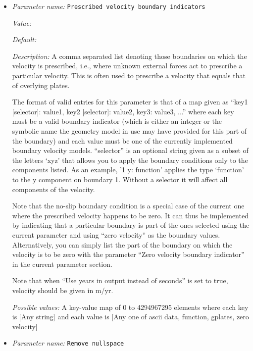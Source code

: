 \begin{itemize}
{\it Possible values:} A key-value map of 0 to 4294967295 elements  where each key is [Any string] and each value is [Any one of ascii data, function, initial lithostatic pressure, zero traction]
\item {\it Parameter name:} {\tt Prescribed velocity boundary indicators}
\label{parameters:Model settings/Prescribed velocity boundary indicators}


{\it Value:} 


{\it Default:} 


{\it Description:} A comma separated list denoting those boundaries on which the velocity is prescribed, i.e., where unknown external forces act to prescribe a particular velocity. This is often used to prescribe a velocity that equals that of overlying plates.

The format of valid entries for this parameter is that of a map given as ``key1 [selector]: value1, key2 [selector]: value2, key3: value3, ...'' where each key must be a valid boundary indicator (which is either an integer or the symbolic name the geometry model in use may have provided for this part of the boundary) and each value must be one of the currently implemented boundary velocity models. ``selector'' is an optional string given as a subset of the letters `xyz' that allows you to apply the boundary conditions only to the components listed. As an example, '1 y: function' applies the type `function' to the y component on boundary 1. Without a selector it will affect all components of the velocity.

Note that the no-slip boundary condition is a special case of the current one where the prescribed velocity happens to be zero. It can thus be implemented by indicating that a particular boundary is part of the ones selected using the current parameter and using ``zero velocity'' as the boundary values. Alternatively, you can simply list the part of the boundary on which the velocity is to be zero with the parameter ``Zero velocity boundary indicator'' in the current parameter section.

Note that when ``Use years in output instead of seconds'' is set to true, velocity should be given in m/yr. 


{\it Possible values:} A key-value map of 0 to 4294967295 elements  where each key is [Any string] and each value is [Any one of ascii data, function, gplates, zero velocity]
\item {\it Parameter name:} {\tt Remove nullspace}
\label{parameters:Model settings/Remove nullspace}



\end{itemize}
